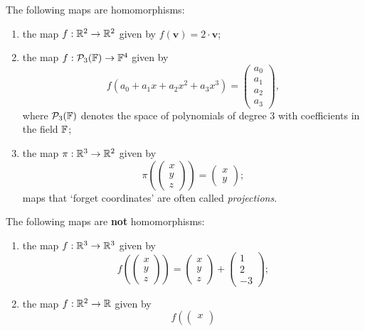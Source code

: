 \begin{example}{}{}
 The following maps are homomorphisms:
 \begin{enumerate}[label=(\alph*)]
  \item the map $f:\mathbb{R}^2 \to \mathbb{R}^2$ given by $f(\mathbf{v}) = 2 \cdot \mathbf{v}$;
  \item the map $f:\mathcal{P}_3(\mathbb{F}) \to \mathbb{F}^{4}$ given by
   \[
    f(a_0 + a_1x + a_2x^2 + a_3x^3) = 
    \begin{pmatrix}
     a_0\\
     a_1\\
     a_2\\
     a_3
    \end{pmatrix},
   \]
   where $\mathcal{P}_3(\mathbb{F})$ denotes the space of polynomials of degree $3$ with
   coefficients in the field $\mathbb{F}$;
  \item the map $\pi: \mathbb{R}^3 \to \mathbb{R}^2$ given by
   \[
    \pi \left( 
    \begin{pmatrix}
     x\\
     y\\
     z
    \end{pmatrix}
    \right) = 
    \begin{pmatrix}
     x\\
     y
    \end{pmatrix};
   \]
   maps that `forget coordinates' are often called \emph{projections}.
 \end{enumerate}
 The following maps are \textbf{not} homomorphisms:
 \begin{enumerate}[label=(\alph*)]
  \item the map $f:\mathbb{R}^3 \to \mathbb{R}^3$ given by
   \[
    f \left( 
    \begin{pmatrix}
     x\\
     y\\
     z
    \end{pmatrix}
    \right) = 
    \begin{pmatrix}
     x\\
     y\\
     z
    \end{pmatrix}
    +
    \begin{pmatrix}
     1\\
     2\\
     -3
    \end{pmatrix};
   \]
  \item the map $f: \mathbb{R}^2 \to \mathbb{R}$ given by
   \[
    f \left( 
    \begin{pmatrix}
     x\\

\end{pmatrix}\]
\end{enumerate}
\end{example}
